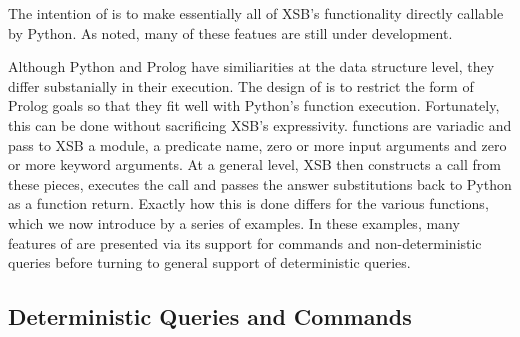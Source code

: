 The intention of \px{} is to make essentially all of XSB's
functionality directly callable by Python.  As noted, many of these
featues are still under development.

Although Python and Prolog have similiarities at the data structure
level, they differ substanially in their execution.  The design of
\px{} is to restrict the form of Prolog goals so that they fit well
with Python's function execution.  Fortunately, this can be done
without sacrificing XSB's expressivity.  \px{} functions are variadic
and pass to XSB a module, a predicate name, zero or more input
arguments and zero or more keyword arguments.  At a general level, XSB
then constructs a call from these pieces, executes the call and passes
the answer substitutions back to Python as a function return. Exactly
how this is done differs for the various \px{} functions, which we now
introduce by a series of examples.  In these examples, many features
of \px{} are presented via its support for commands and
non-deterministic queries before turning to general support of
deterministic queries.

\subsection{Deterministic Queries and Commands} \label{sec:pxdet}

